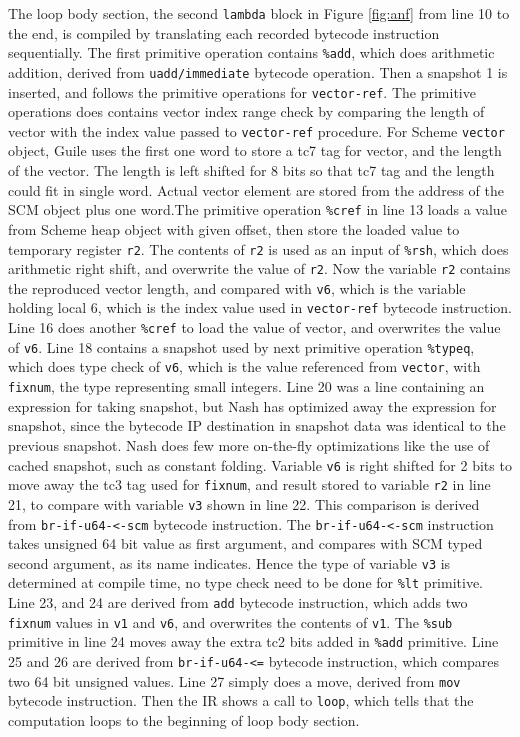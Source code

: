 \documentclass[preprint]{sigplanconf}
\begin{document}
The loop body section, the second \texttt{lambda} block in Figure
\hyperref[fig:anf]{\ref{fig:anf}} from line 10 to the end, is compiled by
translating each recorded bytecode instruction sequentially. The first
primitive operation contains \texttt{\%add}, which does arithmetic addition,
derived from \texttt{uadd/immediate} bytecode operation. Then a snapshot 1 is
inserted, and follows the primitive operations for \texttt{vector-ref}. The
primitive operations does contains vector index range check by comparing the
length of vector with the index value passed to \texttt{vector-ref}
procedure. For Scheme \texttt{vector} object, Guile uses the first one word to
store a tc7 tag for vector, and the length of the vector. The length is left
shifted for 8 bits so that tc7 tag and the length could fit in single
word. Actual vector element are stored from the address of the SCM object plus
one word.\@ The primitive operation \texttt{\%cref} in line 13 loads a value
from Scheme heap object with given offset, then store the loaded value to
temporary register \texttt{r2}. The contents of \texttt{r2} is used as an
input of \texttt{\%rsh}, which does arithmetic right shift, and overwrite the
value of \texttt{r2}. Now the variable \texttt{r2} contains the reproduced
vector length, and compared with \texttt{v6}, which is the variable holding
local 6, which is the index value used in \texttt{vector-ref} bytecode
instruction. Line 16 does another \texttt{\%cref} to load the value of vector,
and overwrites the value of \texttt{v6}. Line 18 contains a snapshot used by
next primitive operation \texttt{\%typeq}, which does type check of
\texttt{v6}, which is the value referenced from \texttt{vector}, with
\texttt{fixnum}, the type representing small integers. Line 20 was a line
containing an expression for taking snapshot, but Nash has optimized away the
expression for snapshot, since the bytecode IP destination in snapshot data
was identical to the previous snapshot. Nash does few more on-the-fly
optimizations like the use of cached snapshot, such as constant
folding. Variable \texttt{v6} is right shifted for 2 bits to move away the tc3
tag used for \texttt{fixnum}, and result stored to variable \texttt{r2} in
line 21, to compare with variable \texttt{v3} shown in line 22. This
comparison is derived from \texttt{br-if-u64-<-scm} bytecode instruction. The
\texttt{br-if-u64-<-scm} instruction takes unsigned 64 bit value as first
argument, and compares with SCM typed second argument, as its name indicates.
Hence the type of variable \texttt{v3} is determined at compile time, no type
check need to be done for \texttt{\%lt} primitive. Line 23, and 24 are derived
from \texttt{add} bytecode instruction, which adds two \texttt{fixnum} values
in \texttt{v1} and \texttt{v6}, and overwrites the contents of
\texttt{v1}. The \texttt{\%sub} primitive in line 24 moves away the extra tc2
bits added in \texttt{\%add} primitive. Line 25 and 26 are derived from
\texttt{br-if-u64-<=} bytecode instruction, which compares two 64 bit unsigned
values. Line 27 simply does a move, derived from \texttt{mov} bytecode
instruction. Then the IR shows a call to \texttt{loop}, which tells that the
computation loops to the beginning of loop body section.
\end{document}
